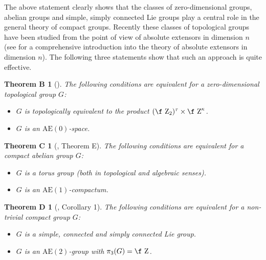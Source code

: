 \documentclass[12pt,draft]{amsart}
\theoremstyle{plain}
\newtheorem*{B}{Theorem B}
\newtheorem*{C}{Theorem C}
\newtheorem*{D}{Theorem D}
\theoremstyle{definition}
\numberwithin{equation}{section}
\begin{document}




The above statement clearly shows that the classes of
zero-dimensional groups,
abelian groups and simple, simply connected Lie groups
play a central role in the
general theory of compact groups. Recently these classes of
topological groups
have been studied from the point of view 
of absolute extensors in dimension $n$ (see \cite{chibook96}
for a comprehensive introduction into the theory of absolute
extensors in dimension $n$). The following three statements
show that such an approach is quite effective.




\begin{B}[\cite{bellchi93}]\label{T:B}
The following conditions are equivalent for a
zero-dimen\-si\-o\-nal topological group $G$:
\begin{itemize}
\item[(a)]
$G$ is topologically equivalent to the product
$(\text{\f Z}_{2})^{\tau} \times \text{\f Z}^{\kappa}$.
\item[(b)]
$G$ is an $\text{AE}(0)$-space.
\end{itemize}
\end{B}




\begin{C}[\cite{chi993}, Theorem E]\label{T:C}
The following conditions are equivalent for a compact
abelian group $G$:
\begin{itemize}
\item[(a)]
$G$ is a torus group (both in topological and algebraic senses).
\item[(b)]
$G$ is an $\text{AE}(1)$-compactum.
\end{itemize}
\end{C}



\begin{D}[\cite{chi972}, Corollary 1]\label{T:D}
The following conditions are equivalent for a non-trivial
compact group $G$:
\begin{itemize}
\item[(a)]
$G$ is a simple, connected and simply connected Lie group.
\item[(b)]
$G$ is an $\text{AE}(2)$-group with $\pi_{3}(G) = \text{\f Z}$.
\end{itemize}
\end{D}
\end{document}
